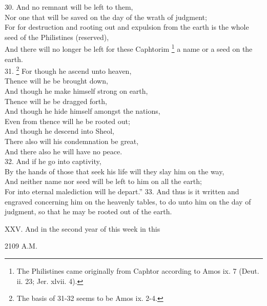 30. And no remnant will be left to them,\\
Nor one that will be saved on the day of the wrath of judgment;\\
For for destruction and rooting out and expulsion from the earth is the whole seed of the Philistines (reserved),\\
And there will no longer be left for these Caphtorim \footnote{The Philistines came originally from Caphtor according to Amos ix. 7 (Deut. ii. 23; Jer. xlvii. 4).} a name or a seed on the earth.\\
31. \footnote{The basis of 31-32 seems to be Amos ix. 2-4.} For though he ascend unto heaven,\\
Thence will he be brought down,\\
And though he make himself strong on earth,\\
Thence will he be dragged forth,\\
And though he hide himself amongst the nations,\\
Even from thence will he be rooted out;\\
And though he descend into Sheol,\\
There also will his condemnation be great,\\
And there also he will have no peace.\\
32. And if he go into captivity,\\
By the hands of those that seek his life will they slay him on the way, \\
And neither name nor seed will be left to him on all the earth;\\
For into eternal malediction will he depart.'' 33. And thus is it written and engraved concerning him on the heavenly tables, to do unto him on the day of judgment, so that he may be rooted out of the earth.


XXV. And in the second year of this week in this

2109 A.M.


